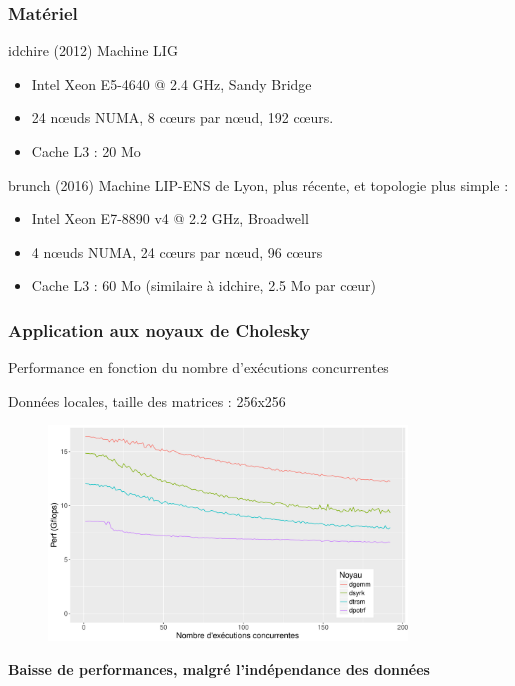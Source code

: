\documentclass[xcolor={usenames,dvipsnames,svgnames,table}, aspectratio=43]{beamer}
\begin{document}
\begin{frame}
  \frametitle{Matériel}

  \begin{block}{idchire (2012)}
    Machine LIG
    \begin{itemize}
      \item Intel Xeon E5-4640 @ 2.4 GHz, Sandy Bridge
      \item 24 nœuds NUMA, 8 cœurs par nœud, 192 cœurs.
      \item Cache L3 : 20 Mo
    \end{itemize}
  \end{block}

  \begin{block}{brunch (2016)}
    Machine LIP-ENS de Lyon, plus récente, et topologie plus simple :
    \begin{itemize}
      \item Intel Xeon E7-8890 v4 @ 2.2 GHz, Broadwell
      \item 4 nœuds NUMA, 24 cœurs par nœud, 96 cœurs
      \item Cache L3 : 60 Mo (similaire à idchire, 2.5 Mo par cœur)
    \end{itemize}
  \end{block}

\end{frame}



\begin{frame}
\frametitle{Application aux noyaux de Cholesky}

Performance en fonction du nombre d'exécutions concurrentes

Données locales, taille des matrices : 256x256
\begin{figure}
  \centering
  \includegraphics[width=0.85\textwidth]{graph/kernel_256_local_idchire.pdf}
\end{figure}

\textbf{Baisse de performances, malgré l'indépendance des données}

\end{frame}
\end{document}

